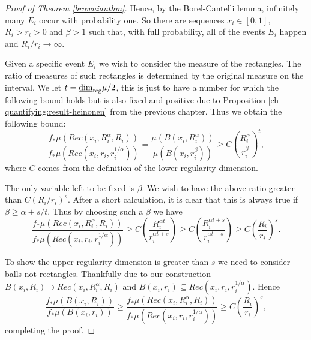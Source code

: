 \begin{proof}[Proof of Theorem \ref{brownianthm}]
Hence, by the Borel-Cantelli lemma, infinitely many $E_i$ occur with probability one. So there are sequences $x_i \in [0,1]$, $R_i > r_i > 0$ and $\beta > 1$ such that, with full probability, all of the events $E_i$ happen and $R_i/r_i \rightarrow \infty$. 

Given a specific event $E_i$ we wish to consider the measure of the rectangles. The ratio of measures of such rectangles is determined by the original measure on the interval. We let $t = \underline{\dim}_{\textup{reg}} \mu / 2$, this is just to have a number for which the following bound holds but is also fixed and positive due to Proposition \ref{ch-quantifying:result-heinonen} from the previous chapter. Thus we obtain the following bound:
\[
\frac{f_*\mu(Rec(x_i,R_i^{\alpha},R_i))}{f_*\mu(Rec(x_i,r_i,r_i^{1/\alpha}))} = \frac{\mu(B(x_i, R_i^{\alpha}))}{\mu(B(x_i, r_i^{\beta}))} \ge C\left(\frac{R_i^{\alpha}}{r_i^{\beta}}\right)^t, 
\]
where $C$ comes from the definition of the lower regularity dimension.

The only variable left to be fixed is $\beta$. We wish to have the above ratio greater than $C(R_i/r_i)^s$. After a short calculation, it is clear that this is always true if $\beta \ge \alpha + s/t$. Thus by choosing such a $\beta$ we have
\[
\frac{f_*\mu(Rec(x_i,R_i^{\alpha},R_i))}{f_*\mu(Rec(x_i,r_i,r_i^{1/\alpha}))} \ge C\left(\frac{R_i^{\alpha t}}{r_i^{\alpha t + s} }\right) \ge C\left(\frac{R_i^{\alpha t + s}}{r_i^{\alpha t + s} }\right)  \ge
C\left(\frac{R_i}{r_i}\right)^s. 
\]

To show the upper regularity dimension is greater than $s$ we need to consider balls not rectangles. Thankfully due to our construction $B(x_i,R_i) \supset Rec(x_i, R_i^\alpha, R_i)$ and $B(x_i,r_i) \subseteq Rec(x_i, r_i, r_i^{1/\alpha})$. Hence
\[
\frac{f_*\mu(B(x_i,R_i))}{f_*\mu(B(x_i,r_i))} \ge \frac{f_*\mu(Rec(x_i,R_i^{\alpha},R_i))}{f_*\mu(Rec(x_i,r_i,r_i^{1/\alpha}))} \ge C\left(\frac{R_i}{r_i}\right)^s ,
\]
completing the proof.


\end{proof}
